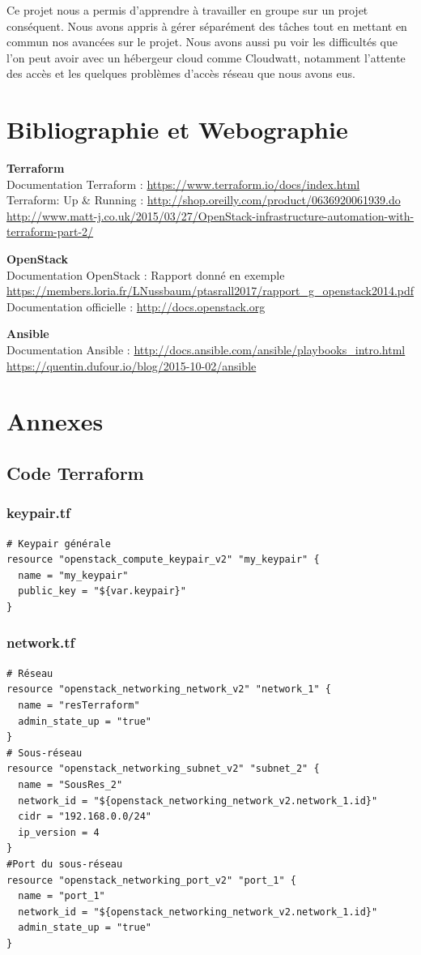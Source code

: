 \documentclass[]{article}
\begin{document}
Ce projet nous a permis d'apprendre à travailler en groupe sur un projet conséquent. Nous avons appris à gérer séparément des tâches tout en mettant en commun nos avancées sur le projet. Nous avons aussi pu voir les difficultés que l'on peut avoir avec un hébergeur cloud comme Cloudwatt, notamment l'attente des accès et les quelques problèmes d'accès réseau que nous avons eus.

\newpage
\section{Bibliographie et Webographie}

\textbf{Terraform}\\
Documentation Terraform : \url{https://www.terraform.io/docs/index.html} \\
Terraform: Up \& Running : \url{http://shop.oreilly.com/product/0636920061939.do } \\
\url{http://www.matt-j.co.uk/2015/03/27/OpenStack-infrastructure-automation-with-terraform-part-2/}

\textbf{OpenStack}\\
Documentation OpenStack : Rapport donné en exemple \url{https://members.loria.fr/LNussbaum/ptasrall2017/rapport_g_openstack2014.pdf}\\
Documentation officielle : \url{http://docs.openstack.org}

\textbf{Ansible}\\
Documentation Ansible : \url{http://docs.ansible.com/ansible/playbooks_intro.html}\\
\url{https://quentin.dufour.io/blog/2015-10-02/ansible}
\newpage

\section{Annexes}
\subsection*{Code Terraform}
\subsubsection*{keypair.tf}
\begin{verbatim}
# Keypair générale
resource "openstack_compute_keypair_v2" "my_keypair" {
  name = "my_keypair"
  public_key = "${var.keypair}"
}
\end{verbatim}
\subsubsection*{network.tf}
\begin{verbatim}
# Réseau
resource "openstack_networking_network_v2" "network_1" {
  name = "resTerraform"
  admin_state_up = "true"
}
# Sous-réseau
resource "openstack_networking_subnet_v2" "subnet_2" {
  name = "SousRes_2"
  network_id = "${openstack_networking_network_v2.network_1.id}"
  cidr = "192.168.0.0/24"
  ip_version = 4 
}
#Port du sous-réseau
resource "openstack_networking_port_v2" "port_1" {
  name = "port_1"
  network_id = "${openstack_networking_network_v2.network_1.id}"
  admin_state_up = "true"
}
\end{verbatim}
\end{document}
